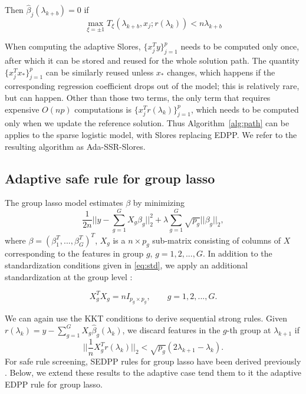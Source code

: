 \begin{theorem}
Then $\hat{\beta}_j(\lambda_{k+b})=0$ if
  \begin{equation}
    \max_{\xi=\pm1} T_\xi(\lambda_{k+b},x_j;r(\lambda_k))<n\lambda_{k+b}
  \end{equation}
\end{theorem}

When computing the adaptive Slores, $\{x_j^Ty\}_{j=1}^p$ needs to be computed only once, after which it can be stored and reused for the whole solution path. The quantity $\{x_j^Tx_*\}_{j=1}^p$ can be similarly reused unless $x_*$ changes, which happens if the corresponding regression coefficient drops out of the model; this is relatively rare, but can happen. Other than those two terms, the only term that requires expensive $O(np)$ computations is $\{x_j^Tr(\lambda_k)\}_{j=1}^p$, which needs to be computed only when we update the reference solution. Thus Algorithm~\ref{alg:path} can be applies to the sparse logistic model, with Slores replacing EDPP. We refer to the resulting algorithm as Ada-SSR-Slores.

\subsection{Adaptive safe rule for group lasso}

The group lasso model \citep{yuan2006model} estimates $\beta$ by minimizing
\begin{equation}
    \label{eq:glasso}
    \frac{1}{2n}\bigg|\bigg|y - \sum_{g=1}^GX_g\beta_g\bigg|\bigg|_2^2 + \lambda\sum_{g=1}^G\sqrt{p_g}||\beta_g||_2,
\end{equation}
where $\beta=(\beta_1^T,...,\beta_G^T)^T$, $X_g$ is a $n\times p_g$ sub-matrix consisting of columns of $X$ corresponding to the features in group $g$, $g=1,2,...,G$. In addition to the standardization conditions given in \eqref{eq:std}, we apply an additional standardization at the group level \citep{breheny2015group}:

\begin{equation}
    \label{eq:stdg}
    X_g^TX_g=nI_{p_g\times p_g},\qquad g=1,2,...,G.
\end{equation}

We can again use the KKT conditions to derive sequential strong rules. Given $r(\lambda_k)=y-\sum_{g=1}^GX_g\hat{\beta}_g(\lambda_k)$, we discard features in the $g$-th group at $\lambda_{k+1}$ if
\begin{equation} \bigg|\bigg|\frac{1}{n}X_g^Tr(\lambda_k)\bigg|\bigg|_2<\sqrt{p_g}(2\lambda_{k+1}-\lambda_k).
\end{equation}
For safe rule screening, SEDPP rules for group lasso have been derived previously \citep{wang2013lasso}. Below, we extend these results to the adaptive case tend them to it the adaptive EDPP rule for group lasso.

